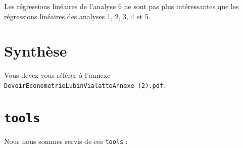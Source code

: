 \documentclass[
  11pt,
  french,
]{article}
\begin{document}
Les régressions linéaires de l'analyse 6 ne sont pas plus intéressantes
que les régressions linéaires des analyses 1, 2, 3, 4 et 5.

\hypertarget{synthuxe8se}{%
\section{Synthèse}\label{synthuxe8se}}

Vous devez vous référer à l'annexe
\texttt{DevoirEconometrieLubinVialatteAnnexe\ (2).pdf}.

\hypertarget{tools}{%
\section{\texorpdfstring{\texttt{tools}}{tools}}\label{tools}}

Nous nous sommes servis de ces \texttt{tools} :
\end{document}
